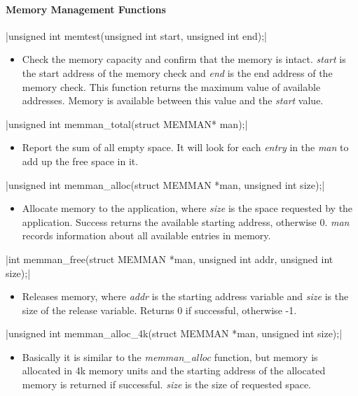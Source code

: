 \documentclass{swfcthesis}
\begin{document}
\paragraph{Memory Management Functions}
\csingle|unsigned int memtest(unsigned int start, unsigned int end);|
\begin{itemize}
\item Check the memory capacity and confirm that the memory is intact. \emph{start} is the start
  address of the memory check and \emph{end} is the end address of the memory
  check. This function returns the maximum value of available addresses. Memory is
  available between this value and the \emph{start} value.
\end{itemize}


\csingle|unsigned int memman_total(struct MEMMAN* man);|
\begin{itemize}
\item Report the sum of all empty space. It will look for each \emph{entry} in the
  \emph{man} to add up the free space in it.
  
\end{itemize}

\csingle|unsigned int memman_alloc(struct MEMMAN *man, unsigned int size);|
\begin{itemize}
\item Allocate memory to the application, where \emph{size} is the space requested by the
  application. Success returns the available starting address, otherwise 0. \emph{man} records
  information about all available entries in memory.
  
\end{itemize}

\csingle|int memman_free(struct MEMMAN *man, unsigned int addr, unsigned int size);|
\begin{itemize}
\item Releases memory, where \emph{addr} is the starting address variable and
  \emph{size} is the size of the release variable. Returns 0 if successful, otherwise
  -1.
\end{itemize}

\csingle|unsigned int memman_alloc_4k(struct MEMMAN *man, unsigned int size);|
\begin{itemize}
\item Basically it is similar to the \emph{memman\_alloc} function, but memory is allocated
  in 4k memory units and the starting address of the allocated memory is returned if
  successful. \emph{size} is the size of requested space.
\end{itemize}
\end{document}
